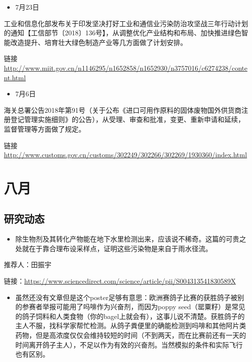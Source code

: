 \documentclass[
]{book}
\providecommand{\tightlist}{%
  \setlength{\itemsep}{0pt}\setlength{\parskip}{0pt}}
\begin{document}
\begin{itemize}
\tightlist
\item
  7月23日
\end{itemize}

工业和信息化部发布关于印发坚决打好工业和通信业污染防治攻坚战三年行动计划的通知【工信部节〔2018〕136号】，从调整优化产业结构和布局、加快推进绿色智能改造提升、培育壮大绿色制造产业等几方面做了计划安排。

链接 \url{http://www.miit.gov.cn/n1146295/n1652858/n1652930/n3757016/c6274238/content.html}

\begin{itemize}
\tightlist
\item
  7月6日
\end{itemize}

海关总署公告2018年第91号（关于公布《进口可用作原料的固体废物国外供货商注册登记管理实施细则》的公告），从受理、审查和批准，变更、重新申请和延续，监督管理等方面做了规定。

链接 \url{http://www.customs.gov.cn/customs/302249/302266/302269/1930360/index.html}

\hypertarget{ux516bux6708}{%
\section*{八月}\label{ux516bux6708}}

\hypertarget{ux7814ux7a76ux52a8ux6001-9}{%
\subsection*{研究动态}\label{ux7814ux7a76ux52a8ux6001-9}}

\begin{itemize}
\tightlist
\item
  除生物剂及其转化产物能在地下水里检测出来，应该说不稀奇。这篇的可贵之处就在于靠合理布设采样点，证明这些污染物是来自于雨水径流。
\end{itemize}

推荐人：田振宇

链接：\url{https://www.sciencedirect.com/science/article/pii/S004313541830589X}

\begin{itemize}
\tightlist
\item
  虽然还没有文章但是这个poster足够有意思：欧洲赛鸽子比赛的获胜鸽子被别的参赛者举报可能用了吗啡作为兴奋剂，而因为poppy seed（罂粟籽）是常见的鸽子饲料和人类食物（你的bagel上就会有），这事儿说不清楚。获胜鸽子的主人不服，找科学家帮忙检测。从鸽子粪便里的确能检测到吗啡和其他阿片类药物，但是高浓度仅仅会维持较短的时间（不到两天，而在比赛前还有一天的时间离开鸽子主人），不足以作为有效的兴奋剂。当然模拟的条件和实际飞行也有区别。
\end{itemize}
\end{document}

